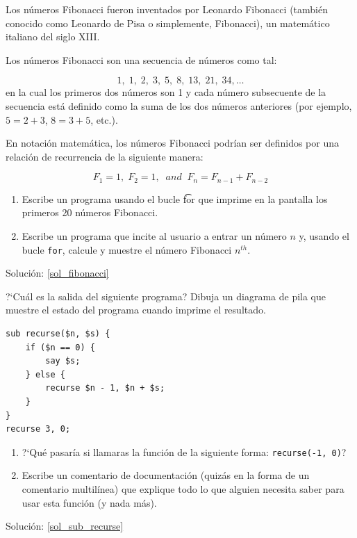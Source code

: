 \begin{exercise} 
\label{fibonacci}
Los números Fibonacci fueron inventados por Leonardo Fibonacci 
(también conocido como Leonardo de Pisa o simplemente, Fibonacci), 
un matemático italiano del siglo XIII.

Los números Fibonacci son una secuencia de números como tal:

\[1, \;1, \;2, \;3, \;5, \;8, \;13, \;21, \;34, \ldots\]
%
en la cual los primeros dos números son 1 y cada número 
subsecuente de la secuencia está definido como la suma de
los dos números anteriores (por ejemplo, $5 = 2 + 3$, $8 = 3 + 5$, etc.).

En notación matemática, los números Fibonacci 
podrían ser definidos por una relación de recurrencia  
de la siguiente manera:

\[F_1 = 1, \;F_2 = 1, \;\;and\;\;  F_n = F_{n-1} + F_{n-2} \]
%
\begin{enumerate}

\item  Escribe un programa usando el bucle {\t for} que imprime
en la pantalla los primeros 20 números Fibonacci.

\item Escribe un programa que incite al usuario a entrar un número $n$ y,
usando el bucle {\tt for}, calcule y muestre el número Fibonacci $n^{th}$.
\end{enumerate}

Solución: \ref{sol_fibonacci}


\end{exercise}

\begin{exercise}
\label{sub_recurse}

?`Cuál es la salida del siguiente programa?
Dibuja un diagrama de pila que muestre el estado del 
programa cuando imprime el resultado.

\begin{lstlisting}
sub recurse($n, $s) {
    if ($n == 0) {
        say $s;
    } else {
        recurse $n - 1, $n + $s;
    }
}
recurse 3, 0;
\end{lstlisting}

\begin{enumerate}

\item ?`Qué pasaría si llamaras la función de la siguiente forma:
{\tt recurse(-1, 0)}?

\item Escribe un comentario de documentación (quizás en la forma de un comentario multilínea) que explique todo lo que alguien necesita saber para usar esta función (y nada más).
\end{enumerate}

Solución: \ref{sol_sub_recurse}

\end{exercise}


